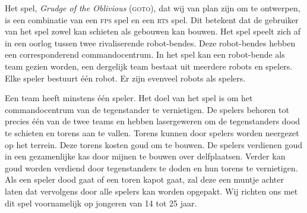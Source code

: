 Het spel, \emph{Grudge of the Oblivious} (\textsc{goto}), dat wij van plan zijn om te ontwerpen, is een combinatie van een \textsc{fps} spel en een \textsc{rts} spel. Dit betekent dat de gebruiker van het spel zowel kan schieten als gebouwen kan bouwen. Het spel speelt zich af in een oorlog tussen twee rivaliserende robot-bendes. Deze robot-bendes hebben een corresponderend commandocentrum. In het spel kan een robot-bende als team gezien worden, een dergelijk team bestaat uit meerdere robots en spelers. Elke speler bestuurt \'e\'en robot. Er zijn evenveel robots als spelers.

Een team heeft minstens \'e\'en speler. Het doel van het spel is om het commandocentrum van de tegenstander te vernietigen. De spelers behoren tot precies \'e\'en van de twee teams en hebben lasergeweren om de tegenstanders dood te schieten en torens aan te vallen. Torens kunnen door spelers worden neergezet op het terrein. Deze torens kosten goud om te bouwen. De spelers verdienen goud in een gezamenlijke kas door mijnen te bouwen over delfplaatsen. Verder kan goud worden verdiend door tegenstanders te doden en hun torens te vernietigen. Als een speler dood gaat of een toren kapot gaat, zal deze een muntje achter laten dat vervolgens door alle spelers kan worden opgepakt. Wij richten ons met dit spel voornamelijk op jongeren van 14 tot 25 jaar.


